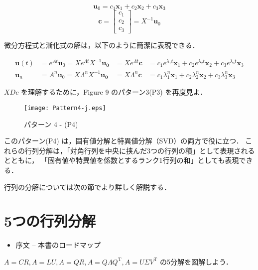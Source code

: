 \documentclass[letterpaper]{article}
\DeclareRobustCommand\transp{^{\mathrm{T}}}
\begin{document}
\begin{equation*}
  \bm{u}_0 = c_1 \bm{x}_1 + c_2 \bm{x}_2 + c_3 \bm{x}_3
\end{equation*}
\begin{equation*}
  \bm{c} =
  \begin{bmatrix}
    c_1\\
    c_2\\
    c_3
  \end{bmatrix} = X^{-1} \bm{u}_0
\end{equation*}

微分方程式と漸化式の解は，以下のように簡潔に表現できる．

\begin{align*}
  \bm{u}(t) &= e^{At} \bm{u}_0 = X e^{\Lambda t} X^{-1} \bm{u_0} &= X e^{\Lambda t} \bm{c} &= c_1 e^{\lambda_1 t} \bm{x}_1 + c_2 e^{\lambda_2 t} \bm{x}_2 + c_3 e^{\lambda_3 t} \bm{x}_3\\
  \bm{u}_n &= A^n \bm{u}_0 = X \Lambda^n X^{-1} \bm{u_0} &= X \Lambda^n \bm{c} &= c_1 \lambda_1^n \bm{x}_1 + c_2 \lambda_2^n \bm{x}_2 + c_3 \lambda_3^n \bm{x}_3
\end{align*}

$XDc$ を理解するために，Figure 9 のパターン3(P3) を再度見よ．

\begin{figure}[H]
  \centering
  \texttt{[image: Pattern4-j.eps]}
  \caption{パターン 4 - (P4)}
\end{figure}

このパターン(P4) は，固有値分解と特異値分解（SVD）の両方で役に立つ．
これらの行列分解は，「対角行列を中央に挟んだ3つの行列の積」として表現されるとともに，
「固有値や特異値を係数とするランク1行列の和」としても表現できる．

行列の分解については次の節でより詳しく解説する．

\clearpage

\section{5つの行列分解}

\begin{itemize}
  \item 序文  -- 本書のロードマップ
\end{itemize}
$A=CR, A=LU, A=QR, A=Q \Lambda Q\transp, A=U \Sigma V\transp$ の5分解を図解しよう．
\end{document}
